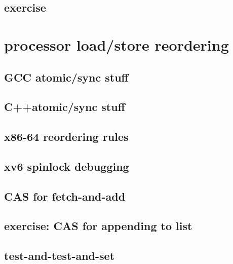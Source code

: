 \subsection{exercise}



\section{processor load/store reordering}


\subsection{GCC atomic/sync stuff}


\subsection{C++atomic/sync stuff}


\subsection{x86-64 reordering rules}


\subsection{xv6 spinlock debugging}



\subsection{CAS for fetch-and-add}


\subsection{exercise: CAS for appending to list}



\subsection{test-and-test-and-set}




